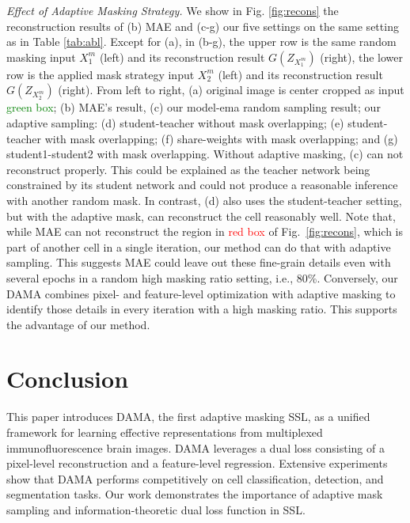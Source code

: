 \documentclass[10pt,twocolumn,letterpaper]{article}
\begin{document}
\textcolor{nblue}{\textit{Effect of Adaptive Masking Strategy.}}
We show in Fig. \ref{fig:recons} the reconstruction results of (b) MAE and (c-g) our five settings on the same setting as in Table \ref{tab:abl}. Except for (a), in (b-g), the upper row is the same random masking input $X_1^m$ (left) and its reconstruction result $G(Z_{X_1^m})$ (right), the lower row is the applied mask strategy input $X_2^m$ (left) and its reconstruction result $G(Z_{X_2^m})$ (right). From left to right, (a) original image is center cropped as input \textcolor{green}{green box}; (b) MAE's result, (c) our model-ema random sampling result; our adaptive sampling: (d) student-teacher without mask overlapping; (e) student-teacher with mask overlapping; (f) share-weights with mask overlapping; and (g) student1-student2 with mask overlapping. Without adaptive masking, (c) can not reconstruct properly. This could be explained as the teacher network being constrained by its student network and could not produce a reasonable inference with another random mask. In contrast, (d) also uses the student-teacher setting, but with the adaptive mask, can reconstruct the cell reasonably well. Note that, while MAE can not reconstruct the region in \textcolor{red}{red box} of Fig.~\ref{fig:recons}, which is part of another cell in a single iteration, our method can do that with adaptive sampling. This suggests MAE could leave out these fine-grain details even with several epochs in a random high masking ratio setting, i.e., 80\%. Conversely, our DAMA combines pixel- and feature-level optimization with adaptive masking to identify those details in every iteration with a high masking ratio. This supports the advantage of our method.

\section{Conclusion}
This paper introduces DAMA, the first adaptive masking SSL, as a unified framework for learning effective representations from multiplexed immunofluorescence brain images. DAMA leverages a dual loss consisting of a pixel-level reconstruction and a feature-level regression. Extensive experiments show that DAMA performs competitively on cell classification, detection, and segmentation tasks. Our work demonstrates the importance of adaptive mask sampling and information-theoretic dual loss function in SSL.

{\small


}
\end{document}
